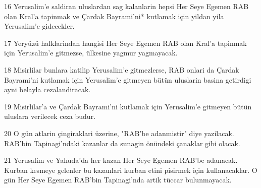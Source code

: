 \par 16 Yerusalim'e saldiran uluslardan sag kalanlarin hepsi Her Seye Egemen RAB olan Kral'a tapinmak ve Çardak Bayrami'ni* kutlamak için yildan yila Yerusalim'e gidecekler.
\par 17 Yeryüzü halklarindan hangisi Her Seye Egemen RAB olan Kral'a tapinmak için Yerusalim'e gitmezse, ülkesine yagmur yagmayacak.
\par 18 Misirlilar bunlara katilip Yerusalim'e gitmezlerse, RAB onlari da Çardak Bayrami'ni kutlamak için Yerusalim'e gitmeyen bütün uluslarin basina getirdigi ayni belayla cezalandiracak.
\par 19 Misirlilar'a ve Çardak Bayrami'ni kutlamak için Yerusalim'e gitmeyen bütün uluslara verilecek ceza budur.
\par 20 O gün atlarin çingiraklari üzerine, "RAB'be adanmistir" diye yazilacak. RAB'bin Tapinagi'ndaki kazanlar da sunagin önündeki çanaklar gibi olacak.
\par 21 Yerusalim ve Yahuda'da her kazan Her Seye Egemen RAB'be adanacak. Kurban kesmeye gelenler bu kazanlari kurban etini pisirmek için kullanacaklar. O gün Her Seye Egemen RAB'bin Tapinagi'nda artik tüccar bulunmayacak.


